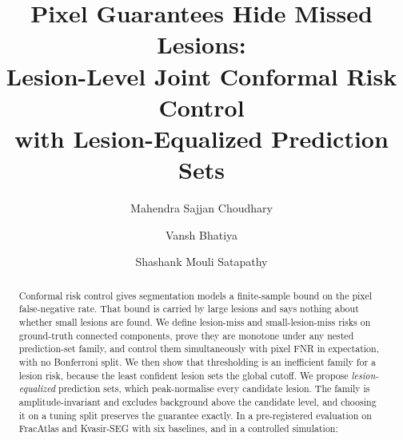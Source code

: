 \documentclass[runningheads]{llncs}
\begin{document}
\title{Pixel Guarantees Hide Missed Lesions:\\Lesion-Level Joint Conformal Risk Control\\with Lesion-Equalized Prediction Sets}
\author{Mahendra Sajjan Choudhary \and Vansh Bhatiya \and Shashank Mouli Satapathy}
\maketitle

\begin{abstract}
Conformal risk control gives segmentation models a finite-sample bound on the
pixel false-negative rate. That bound is carried by large lesions and says
nothing about whether small lesions are found. We define lesion-miss and
small-lesion-miss risks on ground-truth connected components, prove they are
monotone under any nested prediction-set family, and control them
simultaneously with pixel FNR in expectation, with no Bonferroni split. We then
show that thresholding is an inefficient family for a lesion risk, because the
least confident lesion sets the global cutoff. We propose
\emph{lesion-equalized} prediction sets, which peak-normalise every candidate
lesion. The family is amplitude-invariant and excludes background above the
candidate level, and choosing it on a tuning split preserves the guarantee
exactly. In a pre-registered evaluation on FracAtlas and Kvasir-SEG with six
baselines, and in a controlled simulation: \ResultAbstract
{}
\end{abstract}









\appendix

\end{document}
